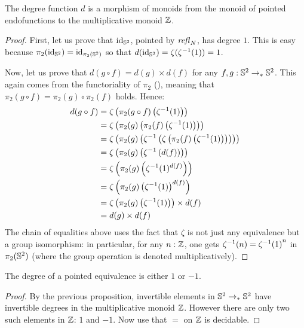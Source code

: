 \documentclass[english,a4]{article}
\newcommand{\ptdto}{\to_\ast}%
\begin{document}
\begin{proposition}
  The degree function $d$ is a morphism of monoids from the monoid of pointed
  endofunctions to the multiplicative monoid $\mathbb{Z}$.
  \label{prop:deg-monoid-morphism}
\end{proposition}
\begin{proof}
  First, let us prove that $\mathord{\mathrm{id}}_{{\mathbb S^{2}}}$, pointed by $\mathop{{\mathit{refl}}_{N}}$, has degree $1$.
  This is easy because $\pi_2(\mathord{\mathrm{id}}_{{\mathbb S^{2}}}) = \mathord{\mathrm{id}}_{\pi_2({{\mathbb S^{2}}})}$ so that $d(\mathord{\mathrm{id}}_{{\mathbb S^{2}}})
  = \zeta({\zeta}^{-1}(1)) = 1$.

  Now, let us prove that $d(g\circ f) = d(g)\times d(f)$ for any $f,g:\Sp
  \ptdto\Sp$. This again comes from the functoriality of $\pi_2$
  (\cite[after Lem.\ 7.3.3 and before Def.\ 8.4.2]{HoTT}), 
  meaning that $\pi_2(g\circ f) = \pi_2(g)\circ\pi_2(f)$
  holds. Hence:
  \begin{align*}
    d(g\circ f) &= \zeta\left( \pi_2(g\circ f)\left( {\zeta}^{-1}(1) \right) \right) 
    \\
    &= \zeta\left( \pi_2(g) \left( \pi_2(f)\left( {\zeta}^{-1}(1) \right)
    \right) \right) 
    \\
    &= \zeta\left( \pi_2(g) \left( {\zeta}^{-1} \left( \zeta \left( \pi_2(f)\left( {\zeta}^{-1}(1) \right)
    \right) \right) \right) \right)
    \\
    &= \zeta \left( \pi_2(g) \left( {\zeta}^{-1} \left(d(f)\right) \right) \right)
    \\
    &= \zeta \left( \pi_2(g) \left( {\zeta}^{-1}(1)^{d(f)} \right) \right)
    \\
    &= \zeta \left( \pi_2(g) \left( {\zeta}^{-1}(1)\right)^{d(f)} \right)
    \\
    &= \zeta \left( \pi_2(g) \left( {\zeta}^{-1}(1)\right) \right)\times d(f)
    \\
    &= d(g)\times d(f)
  \end{align*}
  The chain of equalities above uses the fact that $\zeta$ is not just any
  equivalence but a group isomorphism: in particular, for any $n:\mathbb{Z}$, one
  gets ${\zeta}^{-1}(n) = {{\zeta}^{-1}(1)}^n$ in $\pi_2({{\mathbb S^{2}}})$ (where the group
  operation is denoted multiplicatively).
\end{proof}

\begin{corollary}
  The degree of a pointed equivalence is either $1$ or $-1$.
  \label{cor:degree-equivalences}
\end{corollary}
\begin{proof}
  By the previous proposition, invertible elements in $\Sp \ptdto \Sp$ have
  invertible degrees in the multiplicative monoid $\mathbb{Z}$. However there are only
  two such elements in $\mathbb{Z}$: $1$ and $-1$. Now use that $=$ on $\mathbb{Z}$ is decidable.
\end{proof}
\end{document}
